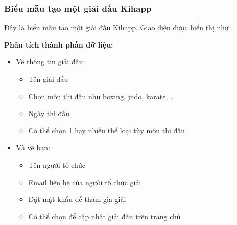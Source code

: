 \subsubsection{Biểu mẫu tạo một giải đấu Kihapp}

Đây là biểu mẫu tạo một giải đấu Kihapp.
Giao diện được hiển thị như .

\noindent
\textbf{Phân tích thành phần dữ liệu:}
\begin{itemize}[leftmargin=1.5cm, label={--}]
  \item Về thông tin giải đấu:
        \begin{itemize}[label={+}]
          \item Tên giải đấu
          \item Chọn môn thi đấu như boxing, judo, karate, …
          \item Ngày thi đấu
          \item Có thể chọn 1 hay nhiều thể loại tùy môn thi đấu
        \end{itemize}
  \item Và về bạn:
        \begin{itemize}[label={+}]
          \item Tên người tổ chức
          \item Email liên hệ của người tổ chức giải
          \item Đặt mật khẩu để tham gia giải
          \item Có thể chọn để cập nhật giải đấu trên trang chủ
        \end{itemize}
\end{itemize}
